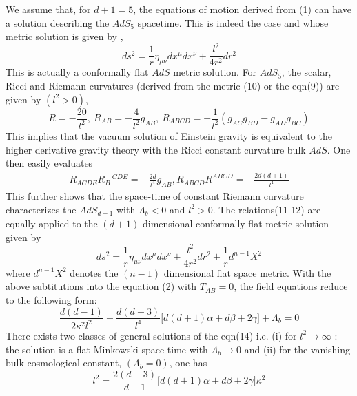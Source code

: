 \documentclass[a4paper,12pt]{article}
\begin{document}
We assume that, for $d+1=5$, the equations of motion derived from (1) can 
have a solution describing the $AdS_5$ spacetime. This is indeed the 
case and whose metric solution is given by \cite{NOJ},
\begin{equation}
ds^2=\frac{1}{r}\eta_{\mu\nu}dx^{\mu}dx^{\nu}+\frac{l^2}{4r^2}dr^2
\end{equation}
This is actually a conformally flat $AdS$ metric solution. 
For $AdS_5$, the scalar, 
Ricci and Riemann curvatures (derived from the metric (10) or the 
eqn(9)) are given by $(l^2>0)$,
\begin{equation}
R=-\frac{20}{l^2},~ R_{AB}=-\frac{4}{l^2}g_{AB},~ R_{ABCD}=-\frac{1}{l^2}
(g_{AC}g_{BD}-g_{AD}g_{BC})
\end{equation}
This implies that the vacuum solution of Einstein gravity is equivalent
to the higher derivative gravity theory with the Ricci constant curvature bulk
 $AdS$. One then easily evaluates 
\begin{eqnarray}
R_{ACDE} R_{B}\,^{CDE}=-\frac{2d}{l^4} g_{AB}, 
 R_{ABCD} R^{ABCD}=-\frac{2d(d+1)}{l^4}
\end{eqnarray}
This further shows that the space-time of constant Riemann curvature 
characterizes the $AdS_{d+1}$ with $\Lambda_b<0$ and $l^2>0$.
The relations(11-12) are equally applied to the $(d+1)$ dimensional
conformally flat metric solution given by
\begin{equation}
ds^2=\frac{1}{r}\eta_{\mu\nu}dx^{\mu}dx^{\nu}+\frac{l^2}{4r^2}dr^2
+\frac{1}{r} d^{n-1}X^2
\end{equation}
where $d^{n-1}X^2$ denotes the $(n-1)$ dimensional flat space metric. 
With the above subtitutions into the equation (2) with $T_{AB}=0$, 
the field equations reduce to the following form:
\begin{equation}
\frac{d(d-1)}{2\kappa^2 l^2}-\frac{d(d-3)}{l^4} \big[ d(d+1)\alpha+
d\beta+2\gamma \big]+\Lambda_b=0
\end{equation}
There exists two classes of general solutions of the eqn(14) i.e. 
(i) for $l^2\to\infty$ : the solution is a flat Minkowski space-time with 
$\Lambda_b\to 0$ and
(ii) for the vanishing bulk cosmological constant, $(\Lambda_b=0)$, one has
\begin{equation}
l^2=\frac{2(d-3)}{d-1}\big[d(d+1)\alpha+d\beta+2\gamma\big]\kappa^2
\end{equation}
\end{document}
